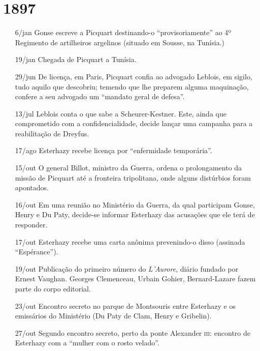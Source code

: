 \section{1897}
\begin{itemize}
\setlength\itemsep{-1mm}
\item[6/jan] Gonse escreve a Picquart destinando-o ``provisoriamente''  ao 4º
Regimento de artilheiros argelinos (situado em Sousse, na Tunísia.)

\item[19/jan] Chegada de Picquart a Tunísia.

\item[29/jun] De licença, em Paris, Picquart confia ao advogado Leblois, em
sigilo, tudo aquilo que descobriu; temendo que lhe preparem alguma maquinação,
confere a seu advogado um ``mandato geral de defesa''.   

\item[13/jul] Leblois conta o que sabe a Scheurer-Kestner. Este, ainda que
comprometido com a confidencialidade, decide lançar uma campanha para a
reabilitação de Dreyfus. 

\item[17/ago] Esterhazy recebe licença por ``enfermidade temporária''.

\item[15/out] O general Billot, ministro da Guerra, ordena o prolongamento da
missão de Picquart até a fronteira tripolitana, onde alguns distúrbios foram
apontados.   

\item[16/out] Em uma reunião no Ministério da Guerra, da qual participam Gonse,
Henry e Du Paty, decide-se informar Esterhazy das acusações que ele terá de
responder.

\item[17/out] Esterhazy recebe uma carta anônima prevenindo-o disso (assinada
``Espérance''). 

\item[19/out] Publicação do primeiro número do \textit{L'Aurore}, diário
fundado por Ernest Vaughan. Georges Clemenceau, Urbain Gohier, Bernard-Lazare
fazem parte do corpo editorial. 

\item[23/out] Encontro secreto no parque de Montsouris entre Esterhazy e os
emissários do Ministério (Du Paty de Clam, Henry e Gribelin).

\item[27/out] Segundo encontro secreto, perto da ponte Alexander \textsc{iii}:
encontro de Esterhazy com a ``mulher com o rosto velado''. 


\end{itemize}
